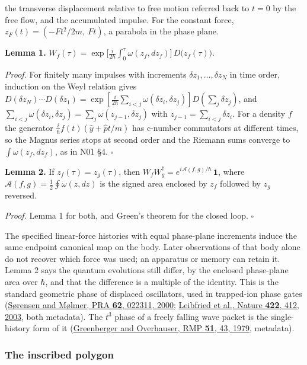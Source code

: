 \documentclass[11pt,a4paper]{article}
\begin{document}
the transverse displacement relative to free motion referred back to
\(t=0\) by the free flow, and the accumulated impulse. For the constant
force, \(z_F(t)=(-Ft^2/2m,\ Ft)\), a parabola in the phase plane.

\textbf{Lemma 1.}
\(W_f(\tau)=\exp\bigl[\frac{i}{2\hbar}\int_0^\tau\omega(z_f,dz_f)\bigr]\,D\bigl(z_f(\tau)\bigr)\).

\emph{Proof.} For finitely many impulses with increments
\(\delta z_1,\dots,\delta z_N\) in time order, induction on the Weyl
relation gives
\(D(\delta z_N)\cdots D(\delta z_1)=\exp[\frac{i}{2\hbar}\sum_{i<j}\omega(\delta z_i,\delta z_j)]D(\sum_j\delta z_j)\),
and
\(\sum_{i<j}\omega(\delta z_i,\delta z_j)=\sum_j\omega(z_{j-1},\delta z_j)\)
with \(z_{j-1}=\sum_{i<j}\delta z_i\). For a density \(f\) the generator
\(\frac{i}{\hbar}f(t)(\hat y+\hat pt/m)\) has c-number commutators at
different times, so the Magnus series stops at second order and the
Riemann sums converge to \(\int\omega(z_f,dz_f)\), as in N01 §4.
\(\square\)

\textbf{Lemma 2.} If \(z_f(\tau)=z_g(\tau)\), then
\(W_fW_g^\dagger=e^{i\mathcal A(f,g)/\hbar}\,\mathbf 1\), where
\(\mathcal A(f,g)=\frac12\oint\omega(z,dz)\) is the signed area enclosed
by \(z_f\) followed by \(z_g\) reversed.

\emph{Proof.} Lemma 1 for both, and Green's theorem for the closed loop.
\(\square\)

The specified linear-force histories with equal phase-plane increments
induce the same endpoint canonical map on the body. Later observations
of that body alone do not recover which force was used; an apparatus or
memory can retain it. Lemma 2 says the quantum evolutions still differ,
by the enclosed phase-plane area over \(\hbar\), and that the difference
is a multiple of the identity. This is the standard geometric phase of
displaced oscillators, used in trapped-ion phase gates
(\href{https://doi.org/10.1103/PhysRevA.62.022311}{Sørensen and Mølmer,
PRA \textbf{62}, 022311, 2000};
\href{https://doi.org/10.1038/nature01492}{Leibfried et al., Nature
\textbf{422}, 412, 2003}, both metadata). The \(t^3\) phase of a freely
falling wave packet is the single-history form of it
(\href{https://doi.org/10.1103/RevModPhys.51.43}{Greenberger and
Overhauser, RMP \textbf{51}, 43, 1979}, metadata).

\hypertarget{the-inscribed-polygon}{%
\subsubsection{The inscribed polygon}\label{the-inscribed-polygon}}
\end{document}
